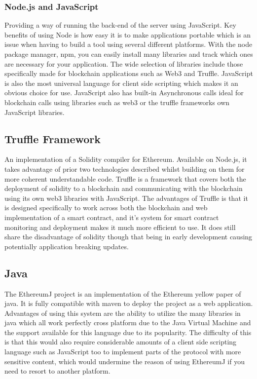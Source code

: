\documentclass{entcs}
\begin{document}
\subsubsection{Node.js and JavaScript}
Providing a way of running the back-end of the server using JavaScript. Key benefits of using Node is how easy it is to make applications portable which is an issue when having to build a tool using several different platforms. With the node package manager, npm, you can easily install many libraries and track which ones are necessary for your application. The wide selection of libraries include those specifically made for blockchain applications such as Web3 and Truffle.
JavaScript is also the most universal language for client side scripting which makes it an obvious choice for use. JavaScript also has built-in Asynchronous calls ideal for blockchain calls using libraries such as web3 or the truffle frameworks own JavaScript libraries. 

\subsection{Truffle Framework}
An implementation of a Solidity compiler for Ethereum. Available on Node.js, it takes advantage of prior two technologies described whilst building on them for more coherent understandable code. Truffle \cite{truffle} is a framework that covers both the deployment of solidity to a blockchain and communicating with the blockchain using its own web3 libraries with JavaScript. The advantages of Truffle is that it is designed specifically to work across both the blockchain and web implementation of a smart contract, and it's system for smart contract monitoring and deployment makes it much more efficient to use. It does still share the disadvantage of solidity though that being in early development causing potentially application breaking updates.

\subsection{Java}
The EthereumJ \cite{EthereumJ} project is an implementation of the Ethereum yellow paper of java. It is fully compatible with maven to deploy the project as a web application. Advantages of using this system are the ability to utilize the many libraries in java which all work perfectly cross platform due to the Java Virtual Machine and the support available for this language due to its popularity. The difficulty of this is that this would also require considerable amounts of a client side scripting language such as JavaScript too to implement parts of the protocol with more sensitive content, which would undermine the reason of using EthereumJ if you need to resort to another platform. 
\end{document}
